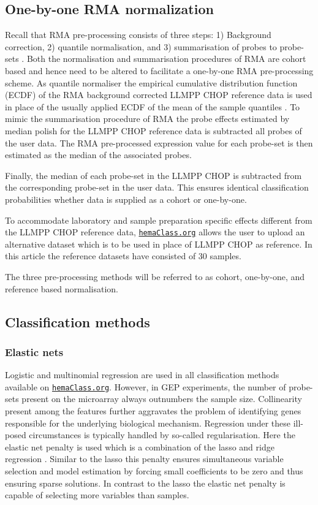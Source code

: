 \documentclass{article}
\newcommand{\hemaClass}{\href{http://hemaClass.org}{\texttt{hemaClass.org}}}
\begin{document}


\subsection{One-by-one RMA normalization}
Recall that RMA pre-processing consists of three steps: 1) Background correction, 2) quantile normalisation, and 3) summarisation of probes to probe-sets \citep{Irizarry2003}.
Both the normalisation and summarisation procedures of RMA are cohort based and hence need to be altered to facilitate a one-by-one RMA pre-processing scheme.
As quantile normaliser the empirical cumulative distribution function (ECDF) of the RMA background corrected LLMPP CHOP reference data is used in place of the usually applied ECDF of the mean of the sample quantiles \citep{Bolstad2003}.
To mimic the summarisation procedure of RMA \citep{Irizarry2003b} the probe effects estimated by median polish for the LLMPP CHOP reference data is subtracted all probes of the user data.
The RMA pre-processed expression value for each probe-set is then estimated as the median of the associated probes.

Finally, the median of each probe-set in the LLMPP CHOP is subtracted from the corresponding probe-set in the user data.
This ensures identical classification probabilities whether data is supplied as a cohort or one-by-one.

To accommodate laboratory and sample preparation specific effects different from the LLMPP CHOP reference data, \hemaClass{} allows the user to upload an alternative dataset which is to be used in place of LLMPP CHOP as reference.
In this article the reference datasets have consisted of 30 samples.

The three pre-processing methods will be referred to as cohort, one-by-one, and reference based normalisation.

\subsection{Classification methods}

\subsubsection{Elastic nets}
Logistic and multinomial regression are used in all classification methods available on \hemaClass{}.
However, in GEP experiments, the number of probe-sets present on the microarray always outnumbers the sample size.
Collinearity present among the features further aggravates the problem of identifying genes responsible for the underlying biological mechanism.
Regression under these ill-posed circumstances is typically handled by so-called regularisation.
Here the elastic net penalty \citep{Friedman2010, Zou2005} is used which is a combination of the lasso \citep{Tibshirani1996} and ridge regression \citep{Hoerl1970}.
Similar to the lasso this penalty ensures simultaneous variable selection and model estimation by forcing small coefficients to be zero and thus ensuring sparse solutions.
In contrast to the lasso the elastic net penalty is capable of selecting more variables than samples.
\end{document}

